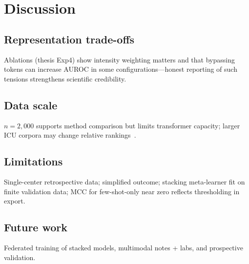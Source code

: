 \section{Discussion}
\label{sec:discuss}

\subsection{Representation trade-offs}
Ablations (thesis Exp4) show intensity weighting matters and that bypassing tokens can increase AUROC in some configurations---honest reporting of such tensions strengthens scientific credibility.

\subsection{Data scale}
$n{=}2{,}000$ supports method comparison but limits transformer capacity; larger ICU corpora may change relative rankings~\citep{purushotham2018benchmarking}.

\subsection{Limitations}
Single-center retrospective data; simplified outcome; stacking meta-learner fit on finite validation data; MCC for few-shot-only near zero reflects thresholding in export.

\subsection{Future work}
Federated training of stacked models, multimodal notes + labs, and prospective validation.
